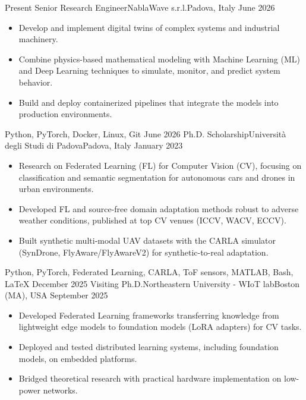 \begin{experiences}
    \experience
    {Present}   {Senior Research Engineer}{NablaWave s.r.l.}{Padova, Italy}
    {June 2026} {
        \begin{itemize}
            \item Develop and implement digital twins of complex systems and industrial machinery.
            \item Combine physics-based mathematical modeling with Machine Learning (ML) and Deep Learning techniques to simulate, monitor, and predict system behavior.
            \item Build and deploy containerized pipelines that integrate the models into production environments.
        \end{itemize}
    }
    {Python, PyTorch, Docker, Linux, Git}
    \emptySeparator
    \experience
    {June 2026}    {Ph.D. Scholarship}{Università degli Studi di Padova}{Padova, Italy}
    {January 2023} {
        \begin{itemize}
            \item Research on Federated Learning (FL) for Computer Vision (CV), focusing on classification and semantic segmentation for autonomous cars and drones in urban environments.
            \item Developed FL and source-free domain adaptation methods robust to adverse weather conditions, published at top CV venues (ICCV, WACV, ECCV).
            \item Built synthetic multi-modal UAV datasets with the CARLA simulator (SynDrone, FlyAware/FlyAwareV2) for synthetic-to-real adaptation.
        \end{itemize}
    }
    {Python, PyTorch, Federated Learning, CARLA, ToF sensors, MATLAB, Bash, \LaTeX}
    \emptySeparator
    \experience
    {December 2025}  {Visiting Ph.D.}{Northeastern University - WIoT lab}{Boston (MA), USA}
    {September 2025} {
        \begin{itemize}
            \item Developed Federated Learning frameworks transferring knowledge from lightweight edge models to foundation models (LoRA adapters) for CV tasks.
            \item Deployed and tested distributed learning systems, including foundation models, on embedded platforms.
            \item Bridged theoretical research with practical hardware implementation on low-power networks.

\end{itemize}}
\end{experiences}
